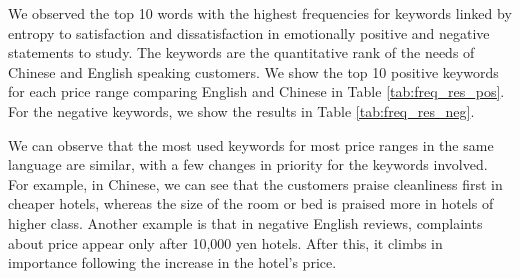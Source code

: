 \documentclass[smallextended,natbib]{svjour3}       %
\begin{document}
    We observed the top 10 words with the highest frequencies for keywords linked by entropy to satisfaction and dissatisfaction in emotionally positive and negative statements to study. The keywords are the quantitative rank of the needs of Chinese and English speaking customers. We show the top 10 positive keywords for each price range comparing English and Chinese in Table \ref{tab:freq_res_pos}. For the negative keywords, we show the results in Table \ref{tab:freq_res_neg}.

    We can observe that the most used keywords for most price ranges in the same language are similar, with a few changes in priority for the keywords involved. For example, in Chinese, we can see that the customers praise cleanliness first in cheaper hotels, whereas the size of the room or bed is praised more in hotels of higher class. Another example is that in negative English reviews, complaints about price appear only after 10,000 yen hotels. After this, it climbs in importance following the increase in the hotel's price.
\end{document}
